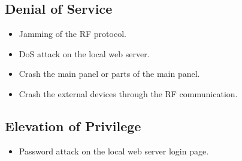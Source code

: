 \subsection{Denial of Service}
\begin{itemize}
    \item Jamming of the RF protocol.
    \item DoS attack on the local web server.
    \item Crash the main panel or parts of the main panel.
    \item Crash the external devices through the RF communication.
\end{itemize}

\subsection{Elevation of Privilege}
\begin{itemize}
    \item Password attack on the local web server login page.
\end{itemize}
